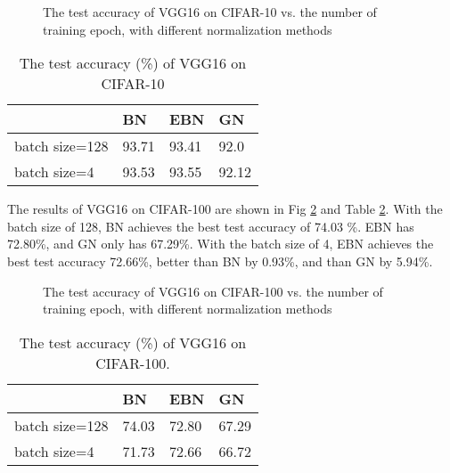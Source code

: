 \documentclass[runningheads]{llncs}
\begin{document}
\begin{figure}[!htb]
\centering
{}
\centering
{}
\caption{The test accuracy of VGG16 on CIFAR-10 vs. the number of training epoch, with different normalization methods}
\label{fig_cifar10_vgg16}
\end{figure}

\begin{table}[!htb]
\caption{The test accuracy (\%) of VGG16 on CIFAR-10}
\label{tab_cifar10_vgg16}
\centering
\begin{tabular}{l|lll}
\hline
  & BN & EBN & GN \\
\hline
batch size=128     & 93.71  & 93.41 & 92.0     \\
batch size=4       & 93.53  & 93.55 & 92.12     \\
\hline
\end{tabular}
\end{table}

The results of VGG16 on CIFAR-100 are shown in Fig \ref{fig_cifar100_vgg16}  and Table \ref{tab_cifar100_vgg16}.
With the batch size of 128, BN achieves the best test accuracy of 74.03 \%. EBN has 72.80\%, and GN  only has 67.29\%. With the batch size of 4, EBN achieves the best test accuracy 72.66\%, better than BN by 0.93\%, and than GN by 5.94\%.

\begin{figure}[!htb]
\centering
{}
\centering
{}
\caption{The test accuracy of VGG16 on CIFAR-100 vs. the number of training epoch, with different normalization methods}
\label{fig_cifar100_vgg16}
\end{figure}

\begin{table}[!htb]
\caption{The test accuracy (\%) of VGG16 on CIFAR-100.}
\label{tab_cifar100_vgg16}
\centering
\begin{tabular}{l|lll}
\hline
  & BN & EBN & GN \\
\hline
batch size=128     & 74.03  & 	72.80 & 67.29     \\
batch size=4       & 71.73  & 72.66 &   66.72     \\
\hline
\end{tabular}
\end{table}
\end{document}
